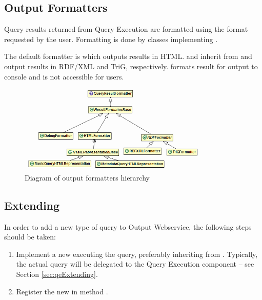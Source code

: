 \subsection{Output Formatters}
Query results returned from Query Execution are formatted using the format requested by the user. Formatting is done by classes implementing .

The default formatter is  which outputs results in HTML.  and  inherit from  and output results in RDF/XML and TriG, respectively.  formats result for output to console and is not accessible for users.

\begin{figure}[htb]
    \centering
    \includegraphics[width=0.8\textwidth]{images/dia-outputws-formatters.png}
    \caption{Diagram of output formatters hierarchy}
	\label{fig:outputwsFormatters}
\end{figure}

\subsection{Extending}
In order to add a new type of query to Output Webservice, the following steps should be taken:

\begin{enumerate}
	\item Implement a new  executing the query, preferably inheriting from \linebreak[4] . Typically, the actual query will be delegated to the Query Execution component -- see Section \ref{sec:qeExtending}.
	\item Register the new  in method .
\end{enumerate}


